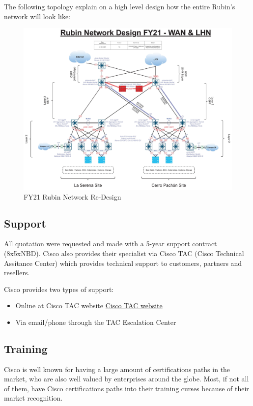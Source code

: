 The following topology explain on a high level design how the entire Rubin's network will look like:

\begin{figure}
    \includegraphics[width=15cm]{images/fy21-rubin-network.jpg}
    \centering
    \caption{FY21 Rubin Network Re-Design}
\end{figure}

\subsection{Support}

All quotation were requested and made with a 5-year support contract (8x5xNBD). Cisco also provides their specialist via Cisco TAC (Cisco Technical Assitance Center) which provides technical support to customers, partners and resellers.

Cisco provides two types of support:

\begin{itemize}
    \item Online at Cisco TAC website \href{http://www.cisco.com/tac}{Cisco TAC website}
    \item Via email/phone through the TAC Escalation Center
\end{itemize}

\subsection{Training}

Cisco is well known for having a large amount of certifications paths in the market, who are also well valued by enterprises around the globe. Most, if not all of them, have Cisco certifications paths into their training curses because of their market recognition.

